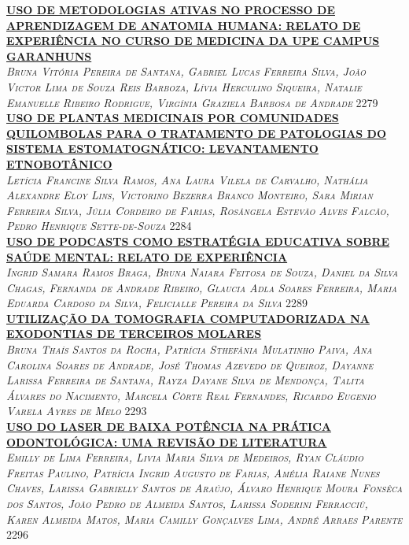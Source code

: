 \noindent \textsc{\hyperlink{trabalhos/250176.pdf.1}{\textbf{USO DE METODOLOGIAS ATIVAS NO PROCESSO DE APRENDIZAGEM DE ANATOMIA HUMANA: RELATO DE EXPERIÊNCIA NO CURSO DE MEDICINA DA UPE CAMPUS GARANHUNS}}}\\ 
\noindent \textsc{\textit{Bruna Vitória Pereira de Santana, Gabriel Lucas Ferreira Silva, João Victor Lima de Souza Reis Barboza, Lívia Herculino Siqueira, Natalie Emanuelle Ribeiro Rodrigue, Virgínia Graziela Barbosa de Andrade}} \hfill 2279\\ 

\noindent \textsc{\hyperlink{trabalhos/251215.pdf.1}{\textbf{USO DE PLANTAS MEDICINAIS POR COMUNIDADES QUILOMBOLAS PARA O TRATAMENTO DE PATOLOGIAS DO SISTEMA ESTOMATOGNÁTICO: LEVANTAMENTO ETNOBOTÂNICO}}}\\ 
\noindent \textsc{\textit{Letícia Francine Silva Ramos, Ana Laura Vilela de Carvalho, Nathália Alexandre Eloy Lins, Victorino Bezerra Branco Monteiro, Sara Mirian Ferreira Silva, Júlia Cordeiro de Farias, Rosângela Estevão Alves Falcão, Pedro Henrique Sette-de-Souza}} \hfill 2284\\ 

\noindent \textsc{\hyperlink{trabalhos/250383.pdf.1}{\textbf{USO DE PODCASTS COMO ESTRATÉGIA EDUCATIVA SOBRE SAÚDE MENTAL: RELATO DE EXPERIÊNCIA}}}\\ 
\noindent \textsc{\textit{Ingrid Samara Ramos Braga, Bruna Naiara Feitosa de Souza, Daniel da Silva Chagas, Fernanda de Andrade Ribeiro, Glaucia Adla Soares Ferreira, Maria Eduarda Cardoso da Silva, Felicialle Pereira da Silva}} \hfill 2289\\ 

\noindent \textsc{\hyperlink{trabalhos/250066.pdf.1}{\textbf{UTILIZAÇÃO DA TOMOGRAFIA COMPUTADORIZADA NA EXODONTIAS DE TERCEIROS MOLARES}}}\\ 
\noindent \textsc{\textit{Bruna Thaís Santos da Rocha, Patrícia Sthefânia Mulatinho Paiva, Ana Carolina Soares de Andrade, José Thomas Azevedo de Queiroz, Dayanne Larissa Ferreira de Santana, Rayza Dayane Silva de Mendonça, Talita Álvares do Nacimento, Marcela Côrte Real Fernandes, Ricardo Eugenio Varela Ayres de Melo}} \hfill 2293\\ 

\noindent \textsc{\hyperlink{trabalhos/251209.pdf.1}{\textbf{USO DO LASER DE BAIXA POTÊNCIA NA PRÁTICA ODONTOLÓGICA: UMA REVISÃO DE LITERATURA}}}\\ 
\noindent \textsc{\textit{Emilly de Lima Ferreira, Livia Maria Silva de Medeiros, Ryan Cláudio Freitas Paulino, Patrícia Ingrid Augusto de Farias, Amélia Raiane Nunes Chaves, Larissa Gabrielly Santos de Araújo, Álvaro Henrique Moura Fonsêca dos Santos, João Pedro de Almeida Santos, Larissa Soderini Ferracciù, Karen Almeida Matos, Maria Camilly Gonçalves Lima, André Arraes Parente}} \hfill 2296\\ 

